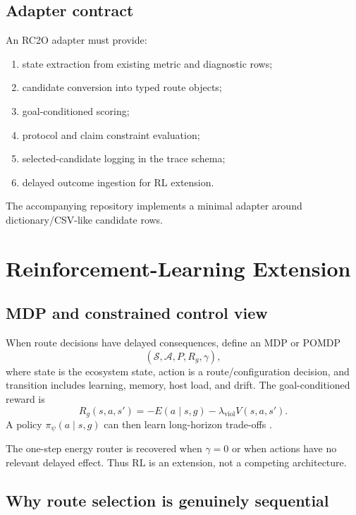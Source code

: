 \documentclass[10pt]{article}
\newcommand{\A}{\mathcal{A}}
\newcommand{\Sset}{\mathcal{S}}
\begin{document}
\subsection{Adapter contract}

An RC2O adapter must provide:
\begin{enumerate}
  \item state extraction from existing metric and diagnostic rows;
  \item candidate conversion into typed route objects;
  \item goal-conditioned scoring;
  \item protocol and claim constraint evaluation;
  \item selected-candidate logging in the trace schema;
  \item delayed outcome ingestion for RL extension.
\end{enumerate}

The accompanying repository implements a minimal adapter around dictionary/CSV-like candidate rows.

\section{Reinforcement-Learning Extension}

\subsection{MDP and constrained control view}

When route decisions have delayed consequences, define an MDP or POMDP
\begin{equation}
  (\Sset,\A,P,R_g,\gamma),
\end{equation}
where state is the ecosystem state, action is a route/configuration decision, and transition includes learning, memory, host load, and drift. The goal-conditioned reward is
\begin{equation}
  R_g(s,a,s')=-E(a\mid s,g)-\lambda_{\mathrm{viol}}V(s,a,s').
  \label{eq:rlreward}
\end{equation}
A policy $\pi_\psi(a\mid s,g)$ can then learn long-horizon trade-offs \citep{sutton2018reinforcement,haarnoja2018soft}.

The one-step energy router is recovered when $\gamma=0$ or when actions have no relevant delayed effect. Thus RL is an extension, not a competing architecture.

\subsection{Why route selection is genuinely sequential}
\end{document}

